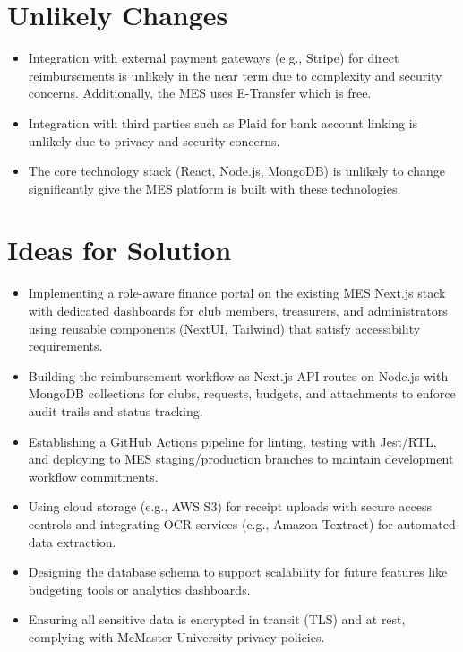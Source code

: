 \documentclass[12pt]{article}
\begin{document}
\begin{enumerate}
\section{Unlikely Changes}    
  \begin{itemize}
    \item Integration with external payment gateways (e.g., Stripe) for direct reimbursements is unlikely in the near term due to complexity and security concerns. Additionally, the MES uses E-Transfer which is free.
    \item Integration with third parties such as Plaid for bank account linking is unlikely due to privacy and security concerns.
    \item The core technology stack (React, Node.js, MongoDB) is unlikely to change significantly give the MES platform is built with these technologies.
  \end{itemize}

\section{Ideas for Solution}
  \begin{itemize}
    \item Implementing a role-aware finance portal on the existing MES Next.js stack with dedicated dashboards for club members, treasurers, and administrators using reusable components (NextUI, Tailwind) that satisfy accessibility requirements.
    \item Building the reimbursement workflow as Next.js API routes on Node.js with MongoDB collections for clubs, requests, budgets, and attachments to enforce audit trails and status tracking.
    \item Establishing a GitHub Actions pipeline for linting, testing with Jest/RTL, and deploying to MES staging/production branches to maintain development workflow commitments.
    \item Using cloud storage (e.g., AWS S3) for receipt uploads with secure access controls and integrating OCR services (e.g., Amazon Textract) for automated data extraction.
    \item Designing the database schema to support scalability for future features like budgeting tools or analytics dashboards.
    \item Ensuring all sensitive data is encrypted in transit (TLS) and at rest, complying with McMaster University privacy policies.
  \end{itemize}


\end{enumerate}
\end{document}
